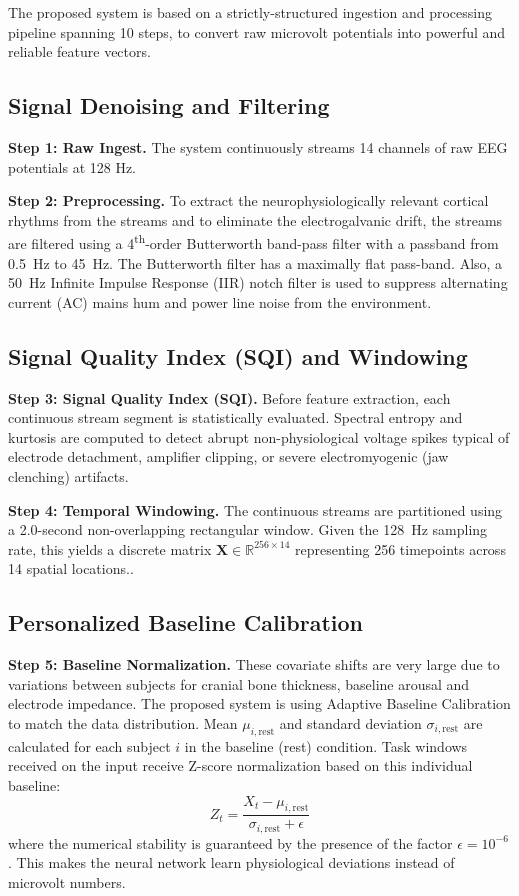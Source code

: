 \documentclass[conference,a4paper]{IEEEtran}
\begin{document}
The proposed system is based on a strictly-structured ingestion and processing pipeline spanning 10 steps, to convert raw microvolt potentials into powerful and reliable feature vectors.

\subsection{Signal Denoising and Filtering}
\textbf{Step 1: Raw Ingest.} The system continuously streams 14 channels of raw EEG potentials at 128 Hz.

\textbf{Step 2: Preprocessing.} To extract the neurophysiologically relevant cortical rhythms from the streams and to eliminate the electrogalvanic drift, the streams are filtered using a 4\textsuperscript{th}-order Butterworth band-pass filter with a passband from 0.5~Hz to 45~Hz. The Butterworth filter has a maximally flat pass-band. Also, a 50~Hz Infinite Impulse Response (IIR) notch filter is used to suppress alternating current (AC) mains hum and power line noise from the environment.

\subsection{Signal Quality Index (SQI) and Windowing}
\textbf{Step 3: Signal Quality Index (SQI).} Before feature extraction, each continuous stream segment is statistically evaluated. Spectral entropy and kurtosis are computed to detect abrupt non-physiological voltage spikes typical of electrode detachment, amplifier clipping, or severe electromyogenic (jaw clenching) artifacts.

\textbf{Step 4: Temporal Windowing.} The continuous streams are partitioned using a 2.0-second non-overlapping rectangular window. Given the 128~Hz sampling rate, this yields a discrete matrix $\mathbf{X} \in \mathbb{R}^{256 \times 14}$ representing 256 timepoints across 14 spatial locations..

\subsection{Personalized Baseline Calibration}
\textbf{Step 5: Baseline Normalization.} These covariate shifts are very large due to variations between subjects for cranial bone thickness, baseline arousal and electrode impedance. The proposed system is using Adaptive Baseline Calibration to match the data distribution. Mean $\mu_{i, \text{rest}}$ and standard deviation $\sigma_{i, \text{rest}}$ are calculated for each subject $i$ in the baseline (rest) condition. Task windows received on the input receive Z-score normalization based on this individual baseline:
\begin{equation}
Z_{t} = \frac{X_{t} - \mu_{i, \text{rest}}}{\sigma_{i, \text{rest}} + \epsilon}
\end{equation}
where the numerical stability is guaranteed by the presence of the factor $\epsilon = 10^{-6}$. This makes the neural network learn physiological deviations instead of microvolt numbers.
\end{document}
